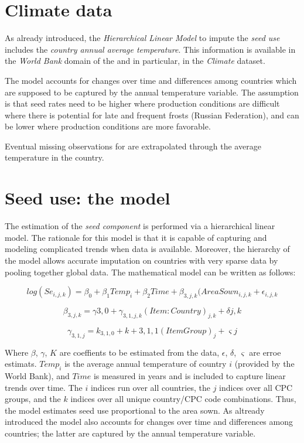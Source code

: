 \documentclass[nojss]{jss}
\begin{document}
\section{Climate data}

As already introduced, the \textit{Hierarchical Linear Model} to impute the \textit{seed use} includes the  \textit{country annual average temperature}. This information is available in the \textit{World Bank} domain of the  and in particular, in the \textit{Climate} dataset.

The model accounts for changes over time and differences among countries which are supposed to be captured by the annual temperature variable. The assumption is that seed rates
need to be higher where production conditions are difficult where there is potential for late
and frequent frosts (Russian Federation), and can be lower where production conditions are
more favorable.

Eventual missing observations for  are extrapolated through the average temperature in the country.


\section{Seed use: the model}

The estimation of the \textit{seed component} is performed via a hierarchical linear model.  The rationale for this model is that it is capable of capturing and modeling complicated trends when data is available.  Moreover, the hierarchy of the model allows accurate imputation on countries with very sparse data by pooling together global data.  The mathematical model can be written as follows:


\begin{dmath}
log(Se_{i,j,k})=\beta_{0} +\beta_{1} Temp_{i}+\beta_{2}Time+\beta_{3,j,k}(AreaSown_{i,j,k}+\epsilon_{i,j,k}
\end{dmath}


\begin{dmath}
\beta_{3,j,k}=\gamma{3,0}+\gamma_{3,1,j,k}(Item:Country)_{j,k}+\delta{j,k}
\end{dmath}


\begin{dmath}
\gamma_{3,1,j}=k_{3,1,0}+k+{3,1,1}(Item Group)_j + \varsigma{j}
\end{dmath}

Where $\beta$, $\gamma$, $K$ are coeffients to be estimated from the data, $\epsilon$, $\delta$, $\varsigma$ are erroe estimats. $Temp_{i} $ is the average annual temperature of country $i$ (provided by the World Bank), and $Time$ is measured in years and is included to capture linear trends over time. The $i$ indices run over all countries, the $j$ indices over all CPC groups, and the $k$ indices over all unique country/CPC code combinations. Thus, the model estimates seed use proportional to the area sown. As altready introduced the model also accounts for changes over time and differences among countries; the latter are captured by the annual temperature variable.
\end{document}
